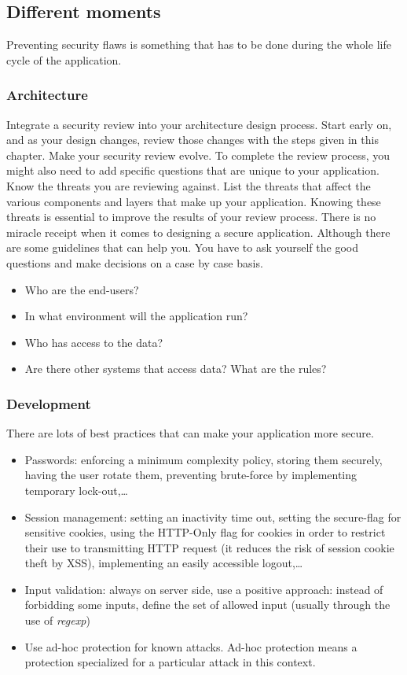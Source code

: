 \subsection{Different moments}

Preventing security flaws is something that has to be done during the
whole life cycle of the application.

\subsubsection{Architecture}

Integrate a security review into your architecture design process. Start
early on, and as your design changes, review those changes with the
steps given in this chapter.
Make your security review evolve. To complete the review
process, you might also need to add specific questions that are unique
to your application.
Know the threats you are reviewing against. List the threats that affect the
various components and layers that make up your application.
Knowing these threats is essential to improve the results of your review process.
There is no miracle receipt when it comes to designing a secure
application. Although there are some guidelines that can help you. You
have to ask yourself the good questions and make decisions on a case by
case basis.

\begin{itemize}
\item Who are the end-users?
\item In what environment will the application run?
\item Who has access to the data?
\item Are there other systems that access data? What are the rules?
\end{itemize}

\subsubsection{Development}

There are lots of best practices that can make your application more secure.
\begin{itemize}
\item Passwords: enforcing a minimum complexity policy, storing them securely,
having the user rotate them, preventing brute-force by implementing temporary
lock-out,\ldots
\item Session management: setting an inactivity time out, setting the
secure-flag for sensitive cookies, using the HTTP-Only flag for
cookies in order to restrict their use to transmitting HTTP request
(it reduces the risk of session cookie theft by XSS),
implementing an easily accessible logout,\ldots
\item Input validation: always on server side, use a positive
  approach: instead of forbidding some inputs, define the set of
  allowed input (usually through the use of \textit{regexp})
\item Use ad-hoc protection for known attacks. Ad-hoc protection means a
protection specialized for a particular attack in this context.
\end{itemize}

